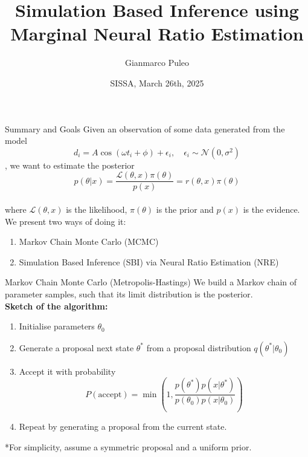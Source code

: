 \documentclass{beamer}
\title{Simulation Based Inference using Marginal Neural Ratio Estimation}
\author{Gianmarco Puleo}
\date{SISSA, March 26th, 2025}
\begin{document}
\frame{\titlepage}

\begin{frame}{Summary and Goals}
    Given an observation of some data generated from the model
    \begin{equation}
        d_i = A \cos (\omega t_i + \phi) + \epsilon_i, \quad \epsilon_i \sim \mathcal{N}(0, \sigma^2)\label{eq:model}
    \end{equation}
    , we want to estimate the posterior 
    \begin{equation}
        p(\theta | x) = \frac{\mathcal{L}(\theta, x) \pi(\theta)}{p(x)} = r(\theta, x) \pi(\theta)
    \end{equation}
    \\
    where $\mathcal{L}(\theta, x)$ is the likelihood, $\pi(\theta)$ is the prior and $p(x)$ is the evidence.
    We present two ways of doing it:
    \begin{enumerate}
        \item Markov Chain Monte Carlo (MCMC)
        \item Simulation Based Inference (SBI) via Neural Ratio Estimation (NRE)
    \end{enumerate}
\end{frame}

\begin{frame}{Markov Chain Monte Carlo (Metropolis-Hastings)}
    We build a Markov chain of parameter samples, such that its limit distribution is the posterior. \\
    \textbf{Sketch of the algorithm:}
    \begin{enumerate}
        \item Initialise parameters $\theta_0$
        \item Generate a proposal next state $\theta^*$ from a proposal distribution $q(\theta^* | \theta_0)$
        \item Accept it with probability
        \[ P(\text{accept}) = \min\left(1, \frac{p(\theta^*) p(x | \theta^*)}{p(\theta_0) p(x | \theta_0)} \right) \]
        \item Repeat by generating a proposal from the current state.
    \end{enumerate}
    *For simplicity, assume a symmetric proposal and a uniform prior.
\end{frame}
\end{document}
